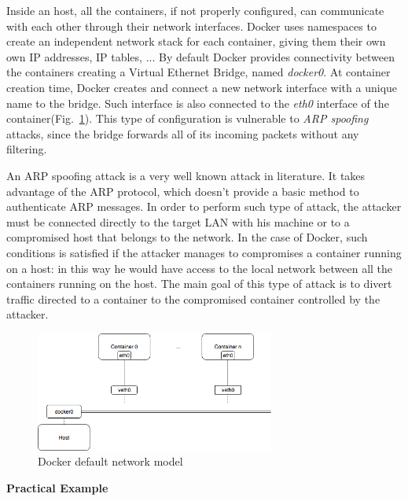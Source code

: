 \documentclass[a4paper,12pt]{article}
\def\myfig#1{Fig.~#1\xspace}
\begin{document}
Inside an host, all the containers, if not properly configured, can communicate
with each other through their network interfaces. Docker uses namespaces to
create an independent network stack for each container, giving them their own
own IP addresses, IP tables, ... By default Docker provides connectivity between
the containers creating a Virtual Ethernet Bridge, named \textit{docker0}. At
container creation time, Docker creates and connect a new network interface with
a unique name to the bridge. Such interface is also connected to the
\textit{eth0} interface of the
container(\myfig{\ref{fig:docker_network_model}}). This type of configuration is
vulnerable to \textit{ARP spoofing} attacks, since the bridge forwards all of
its incoming packets without any filtering. \par An ARP spoofing attack is a
very well known attack in literature. It takes advantage of the ARP protocol,
which doesn't provide a basic method to authenticate ARP messages. In order to
perform such type of attack, the attacker must be connected directly to the
target LAN with his machine or to a compromised host that belongs to the
network. In the case of Docker, such conditions is satisfied if the attacker
manages to compromises a container running on a host: in this way he would have
access to the local network between all the containers running on the host. The
main goal of this type of attack is to divert traffic directed to a container to
the compromised container controlled by the attacker.   
\begin{figure}[ht!]
  \centerline{\includegraphics[width=0.7\textwidth]{docker-network-model.png}}
  \caption{Docker default network model}
  \label{fig:docker_network_model}
  \end{figure}

\bigbreak\textbf{Practical Example}\bigbreak 
\end{document}
